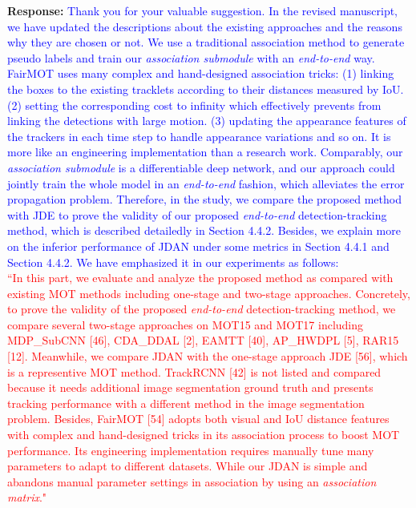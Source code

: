 \documentclass[12pt,journal,onecolumn]{IEEEtran}
\begin{document}
\textbf{Response:} \textcolor{blue}{Thank you for your valuable suggestion. 
In the revised manuscript, we have updated the descriptions about the existing approaches and the reasons why they are chosen or not.
We use a traditional association method to generate pseudo labels and train our \emph{association submodule} with an \emph{end-to-end} way.
FairMOT uses many complex and hand-designed association tricks: 
(1) linking the boxes to the existing tracklets according to their distances measured by IoU. 
(2) setting the corresponding cost to infinity which effectively prevents from linking the detections with large motion. 
(3) updating the appearance features of the trackers in each time step to handle appearance variations and so on.
It is more like an engineering implementation than a research work. 
Comparably, our \emph{association submodule} is a differentiable deep network, and our approach could jointly train the whole model in an \emph{end-to-end} fashion,
which alleviates the error propagation problem. 
Therefore, in the study, we compare the proposed method with JDE to prove the validity of our proposed \emph{end-to-end} detection-tracking method, which is described detailedly in Section 4.4.2. 
Besides, we explain more on the inferior performance of JDAN under some metrics in Section 4.4.1 and Section 4.4.2.
We have emphasized it in our experiments as follows: \\
}
\textcolor{red}{
``In this part, we evaluate and analyze the proposed method as compared with existing MOT methods including one-stage and two-stage approaches. Concretely, to prove the validity of the proposed \emph{end-to-end} detection-tracking method, we compare several two-stage approaches on MOT15 and MOT17 including MDP\_SubCNN [46], CDA\_DDAL [2], EAMTT [40], AP\_HWDPL [5], RAR15 [12].
Meanwhile, we compare JDAN with the one-stage approach JDE [56], which is a representive MOT method.
TrackRCNN [42] is not listed and compared because it needs additional image segmentation ground truth and presents tracking performance with a different method in the image segmentation problem. 
Besides, FairMOT [54] adopts both visual and IoU distance features with complex and hand-designed tricks in its association process to boost MOT performance.
Its engineering implementation requires manually tune many parameters to adapt to different datasets.
While our JDAN is simple and abandons manual parameter settings in association by using an \emph{association matrix}."
} \\
\end{document}
